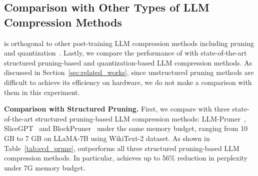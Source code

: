 \subsection{Comparison with Other Types of LLM Compression Methods}
\label{subsection:Comparison_with_other_compression_methods}
\vspace{-1mm}
\sysname is orthogonal to other post-training LLM compression methods including pruning and quantization~\citep{DBLP:journals/tmlr/Wan0LA0LQYZZC024, shen2025efficient}. Lastly, we compare the performance of \sysname with state-of-the-art structured pruning-based and quantization-based LLM compression methods. As discussed in Section~\ref{sec:related_works}, since unstructured pruning methods are difficult to achieve its efficiency on hardware, we do not make a comparison with them in this experiment.

\vspace{-0mm}
\textbf{Comparison with Structured Pruning.}
First, we compare \sysname with three state-of-the-art structured pruning-based LLM compression methods: LLM-Pruner~\citep{DBLP:conf/nips/MaFW23}, SliceGPT~\citep{DBLP:conf/iclr/AshkboosCNHH24} and BlockPruner~\citep{DBLP:journals/corr/abs-2406-10594} under the same memory budget, ranging from 10 GB to 7 GB on LLaMA-7B using WikiText-2 dataset. 
%
As shown in Table~\ref{tab:svd_prune}, \sysname outperforms all three structured pruning-based LLM compression methods. In particular, \sysname achieves up to 56\% reduction in perplexity under 7G memory budget.

